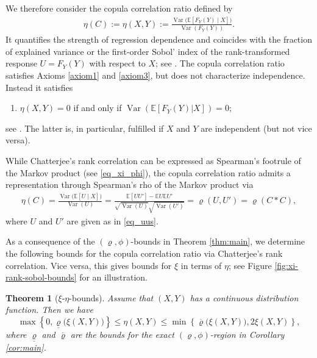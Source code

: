 \documentclass{article}
\newtheorem{theorem}{Theorem}[section]
\newcommand{\brho}{\overline\varrho}
\newcommand{\Var}{\operatorname{Var}}
\newcommand{\E}{\mathbb{E}}
\begin{document}
We therefore consider the copula correlation ratio \cite{shih2021copula,sungur2005note} defined by
\begin{align}\label{def_cop_cor_ratio}
    \eta(C):=\eta(X,Y) := \frac{\Var\bigl(\E[F_Y(Y)\mid X]\bigr)}{\Var(F_Y(Y))}.
\end{align}
It quantifies the strength of regression dependence and coincides with the fraction of explained variance or the first-order Sobol' index of the rank-transformed response \(U=F_Y(Y)\) with respect to \(X\); see \cite{gamboa2022global}.
The copula correlation ratio satisfies Axioms \ref{axiom1} and \ref{axiom3}, but does not characterize independence.
Instead it satisfies
\begin{enumerate}[label = (\Roman*'), start = 2]
    \item \(\eta(X,Y) = 0\) if and only if \(\Var(\E[F_Y(Y)| X]) = 0\);
\end{enumerate}
see \cite[Theorem 2.2]{ansari2026quantifying}.
The latter is, in particular, fulfilled if \(X\) and \(Y\) are independent (but not vice versa).

While Chatterjee's rank correlation can be expressed as Spearman's footrule of the Markov product (see \eqref{eq_xi_phi}), the copula correlation ratio admits a representation through Spearman's rho of the Markov product via
\begin{align}\label{eq_rep_ccorr}
    \eta(C) = \frac{\Var\bigl(\E[U\mid X]\bigr)}{\Var(U)} = \frac{\E [U U'] - \E U \E U'}{\sqrt{\Var(U)} \sqrt{\Var(U')}} = \varrho(U,U') = \varrho(C\ast C),
\end{align}
where \(U\) and \(U'\) are given as in \eqref{eq_uus}.

As a consequence of the \((\varrho,\phi)\)-bounds in Theorem \ref{thm:main}, we determine the following bounds for the copula correlation ratio via Chatterjee's rank correlation.
Vice versa, this gives bounds for \(\xi\) in terms of \(\eta\); see Figure \ref{fig:xi-rank-sobol-bounds} for an illustration.

\begin{theorem}[\(\xi\)-\(\eta\)-bounds]\label{cor:xi-rank-sobol}
Assume that \((X,Y)\) has a continuous distribution function.
Then we have
\begin{equation}\label{eq:xi-rank-correlation-ratio}
    \max\!\left\{
        0,\underline{\varrho}\bigl(\xi(X,Y)\bigr)
    \right\}
    \leq
    \eta(X,Y)
    \leq
    \min\!\left\{
        \overline{\varrho}\bigl(\xi(X,Y)\bigr),
        2\xi(X,Y)
    \right\},
\end{equation}
where \(\underline{\varrho}\) and \(\brho\) are the bounds for the exact \((\varrho,\phi)\)-region in Corollary \ref{cor:main}.
\end{theorem}
\end{document}

